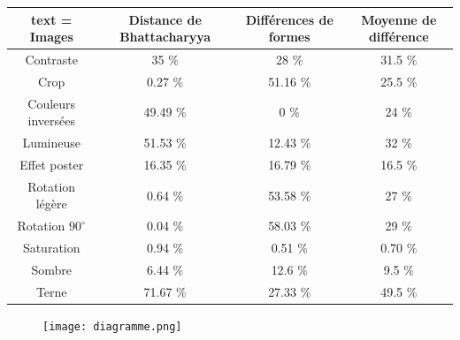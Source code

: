 \documentclass[]{article}
\begin{document}
\begin{center}
\begin{tabular}{|c|c|c||c|}
  \hline
  text = Images & Distance de Bhattacharyya & Différences de formes
    & Moyenne de différence \\
  \hline
  Contraste & 35 \% & 28 \% & 31.5 \% \\
  \hline
  Crop & 0.27 \% & 51.16 \% & 25.5 \% \\
  \hline
  Couleurs inversées & 49.49 \% & 0 \% & 24 \% \\
  \hline
  Lumineuse & 51.53 \% & 12.43 \% & 32 \% \\
  \hline
  Effet poster & 16.35 \% & 16.79 \% & 16.5 \% \\
  \hline
  Rotation légère & 0.64 \% & 53.58 \% & 27 \% \\
  \hline
  Rotation $90^{\circ}$ & 0.04 \% & 58.03 \% & 29 \% \\
  \hline
  Saturation & 0.94 \% & 0.51 \% & 0.70 \% \\
  \hline
  Sombre & 6.44 \% & 12.6 \% & 9.5 \% \\
  \hline
  Terne & 71.67 \% & 27.33 \% & 49.5 \% \\
  \hline
\end{tabular}
\end{center}

\begin{figure}[htbp]
\centering
\texttt{[image: diagramme.png]}
\caption{}
\end{figure}

\newpage
\begin{center}
\begin{bchart}[step=10,max=50,width=7in]
            \smallskip
            \smallskip
            \smallskip
            \smallskip
            \smallskip
            \smallskip
            \smallskip
            \smallskip
            \smallskip
    \end{bchart}
\end{center}
\end{document}
